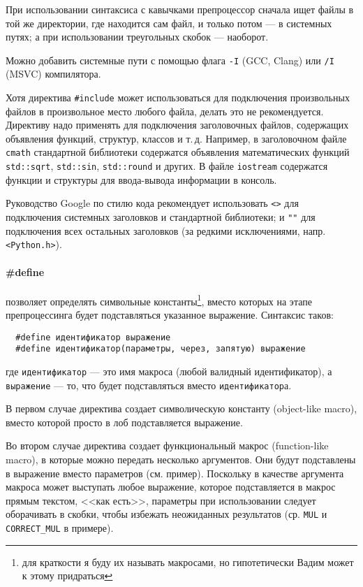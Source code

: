 При использовании синтаксиса с кавычками препроцессор сначала ищет файлы в той же директории,
где находится сам файл, и только потом --- в системных путях; а при использовании треугольных скобок --- наоборот.

{\small Можно добавить системные пути с помощью флага \verb|-I| (GCC, Clang) или \verb|/I| (MSVC) компилятора. }

Хотя директива \verb|#include| может использоваться для подключения произвольных файлов в произвольное место
любого файла, делать это не рекомендуется. Директиву надо применять для подключения заголовочных файлов, содержащих
объявления функций, структур, классов и т.\,д. Например, в заголовочном файле \verb|cmath|
стандартной библиотеки содержатся объявления математических функций \verb|std::sqrt|, \verb|std::sin|,
\verb|std::round| и других. В файле \verb|iostream| содержатся функции и структуры для ввода-вывода информации
в консоль.

Руководство Google по стилю кода рекомендует использовать \verb|<>| для подключения системных заголовков
и стандартной библиотеки; и \verb|""| для подключения всех остальных заголовков (за редкими исключениями, напр. \verb|<Python.h>|).

\paragraph{\#define} позволяет определять символьные константы\footnote{для краткости я буду их называть макросами,
но гипотетически Вадим может к этому придраться}, вместо которых на этапе препроцессинга
будет подставляться указанное выражение.
Синтаксис таков:
\begin{verbatim}
  #define идентификатор выражение
  #define идентификатор(параметры, через, запятую) выражение
\end{verbatim}
где \verb|идентификатор| --- это имя макроса (любой валидный идентификатор),
а \verb|выражение| --- то, что будет подставляться вместо \verb|идентификатор|а.

В первом случае директива создает символическую константу (object-like macro),
вместо которой просто в лоб подставляется выражение.

Во втором случае директива создает функциональный макрос (function-like macro),
в которые можно передать несколько аргументов. Они будут подставлены в выражение
вместо параметров (см. пример). Поскольку в качестве аргумента макроса может
выступать любое выражение, которое подставляется в макрос прямым текстом, <<как есть>>,
параметры при использовании следует оборачивать в скобки, чтобы избежать неожиданных результатов
(ср. \verb|MUL| и \verb|CORRECT_MUL| в примере).

